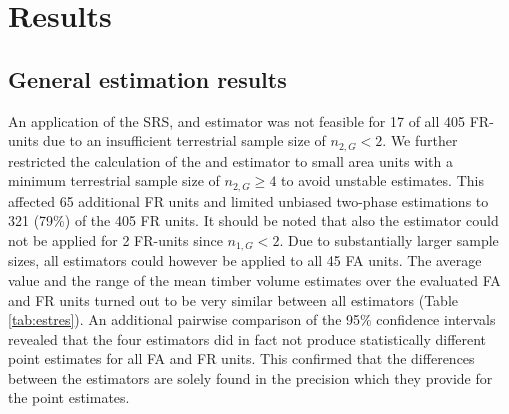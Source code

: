 \section{Results}
\label{sec:Res}

\subsection{General estimation results}
\label{sec:feasest}

An application of the SRS, \psmall{} and \extpsynth{} estimator was not feasible for 17 of all 405 FR-units due to an insufficient terrestrial sample size of $n_{2,G} < 2$. We further restricted the calculation of the \psmall{} and \extpsynth{} estimator to small area units with a minimum terrestrial sample size of $n_{2,G} \geq 4$ to avoid unstable estimates. This affected 65 additional FR units and limited unbiased two-phase estimations to 321 (79\%) of the 405 FR units. It should be noted that also the \psynth{} estimator could not be applied for 2 FR-units since $n_{1,G} < 2$. Due to substantially larger sample sizes, all estimators could however be applied to all 45 FA units. The average value and the range of the mean timber volume estimates over the evaluated FA and FR units turned out to be very similar between all estimators (Table \ref{tab:estres}). An additional pairwise comparison of the 95\% confidence intervals revealed that the four estimators did in fact not produce statistically different point estimates for all FA and FR units. This confirmed that the differences between the estimators are solely found in the precision which they provide for the point estimates.


%
% 


